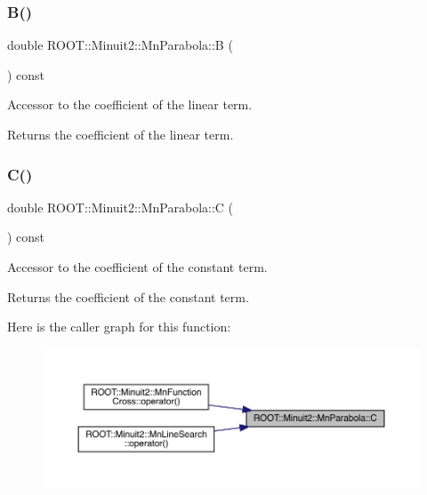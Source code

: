 \subsubsection{\texorpdfstring{B()}{B()}\hspace{0.1cm}{\footnotesize\ttfamily [2/2]}}
{\footnotesize\ttfamily double R\+O\+O\+T\+::\+Minuit2\+::\+Mn\+Parabola\+::B (\begin{DoxyParamCaption}{ }\end{DoxyParamCaption}) const\hspace{0.3cm}{\ttfamily [inline]}}

Accessor to the coefficient of the linear term.

\begin{DoxyReturn}{Returns}
the coefficient of the linear term. 
\end{DoxyReturn}
\mbox{\label{classROOT_1_1Minuit2_1_1MnParabola_a9ca632ea018da194e08eb18d4b0059f9}} 
\subsubsection{\texorpdfstring{C()}{C()}\hspace{0.1cm}{\footnotesize\ttfamily [1/2]}}
{\footnotesize\ttfamily double R\+O\+O\+T\+::\+Minuit2\+::\+Mn\+Parabola\+::C (\begin{DoxyParamCaption}{ }\end{DoxyParamCaption}) const\hspace{0.3cm}{\ttfamily [inline]}}

Accessor to the coefficient of the constant term.

\begin{DoxyReturn}{Returns}
the coefficient of the constant term. 
\end{DoxyReturn}
Here is the caller graph for this function\+:\nopagebreak
\begin{figure}[H]
\begin{center}
\leavevmode
\includegraphics[width=350pt]{db/d7d/classROOT_1_1Minuit2_1_1MnParabola_a9ca632ea018da194e08eb18d4b0059f9_icgraph}
\end{center}
\end{figure}
\mbox{\label{classROOT_1_1Minuit2_1_1MnParabola_a9ca632ea018da194e08eb18d4b0059f9}} 

